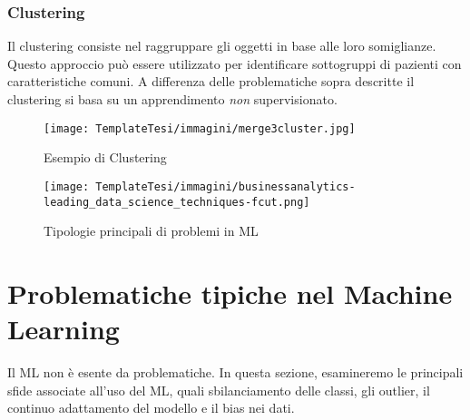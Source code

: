 \begin{flushleft}
\subsubsection{Clustering}

Il clustering consiste nel raggruppare gli oggetti in base alle loro somiglianze. Questo approccio può essere utilizzato per identificare sottogruppi di pazienti con caratteristiche comuni.
A differenza delle problematiche sopra descritte il clustering si basa su un apprendimento \emph{non} supervisionato.


\begin{figure}[H]
    \centering
    \texttt{[image: TemplateTesi/immagini/merge3cluster.jpg]}
    \caption{Esempio di Clustering \cite{ImmClustering}}
    \label{fig:my_label}
\end{figure}

\begin{figure}[H]
    \centering
    \texttt{[image: TemplateTesi/immagini/businessanalytics-leading\_data\_science\_techniques-fcut.png]}
    \caption{Tipologie principali di problemi in ML \cite{ImmProblemiML}}
    \label{fig:my_label}
\end{figure}
\end{flushleft}

\section{Problematiche tipiche nel Machine Learning}
Il ML non è esente da problematiche. In questa sezione, esamineremo le principali sfide associate all'uso del ML, quali sbilanciamento delle classi, gli outlier, il continuo adattamento del modello e il bias nei dati.

